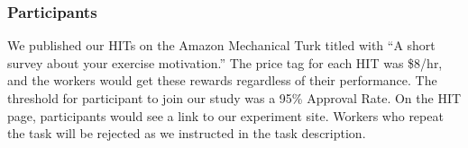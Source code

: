 

\subsubsection{Participants}
We published our HITs on the Amazon Mechanical Turk titled with ``A short survey about your exercise motivation.'' The price tag for each HIT was \$8/hr, and the workers would get these rewards regardless of their performance. The threshold for participant to join our study was a 95\% Approval Rate. On the HIT page, participants would see a link to our experiment site. Workers who repeat the task will be rejected as we instructed in the task description.

